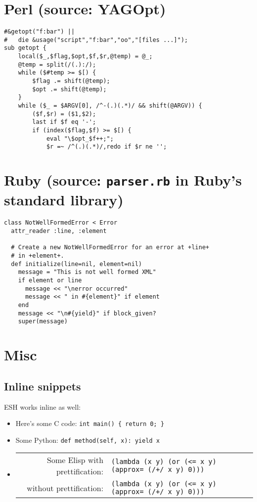 \documentclass{article}
\def\cverb{\verb}
\def\pythonverb{\verb}
\def\prettylisp{\verb}
\def\normallisp{\verb}
\begin{document}
\clearpage

\section*{Perl (source: YAGOpt)}

\begin{verbatim}
#&getopt("f:bar") ||
#	die &usage("script","f:bar","oo","[files ...]");
sub getopt {
    local($_,$flag,$opt,$f,$r,@temp) = @_;
    @temp = split(/(.):/);
    while ($#temp >= $[) {
        $flag .= shift(@temp);
        $opt .= shift(@temp);
    }
    while ($_ = $ARGV[0], /^-(.)(.*)/ && shift(@ARGV)) {
        ($f,$r) = ($1,$2);
        last if $f eq '-';
        if (index($flag,$f) >= $[) {
            eval "\$opt_$f++;";
            $r =~ /^(.)(.*)/,redo if $r ne '';
\end{verbatim}

\section*{Ruby (source: \texttt{parser.rb} in Ruby's standard library)}

\begin{verbatim}
class NotWellFormedError < Error
  attr_reader :line, :element

  # Create a new NotWellFormedError for an error at +line+
  # in +element+.
  def initialize(line=nil, element=nil)
    message = "This is not well formed XML"
    if element or line
      message << "\nerror occurred"
      message << " in #{element}" if element
    end
    message << "\n#{yield}" if block_given?
    super(message)
\end{verbatim}

\section*{Misc}

\subsection*{Inline snippets}

ESH works inline as well:

\begin{itemize}
\item Here's some C code: \cverb|int main() { return 0; }|
\item Some Python: \pythonverb|def method(self, x): yield x|
\item
  \begin{tabular}[t]{@{}r@{ }l}
    Some Elisp with prettification: & \prettylisp|(lambda (x y) (or (<= x y) (approx= (/+/ x y) 0)))| \\
            without prettification: & \normallisp|(lambda (x y) (or (<= x y) (approx= (/+/ x y) 0)))| \\
  \end{tabular}
\end{itemize}
\end{document}
